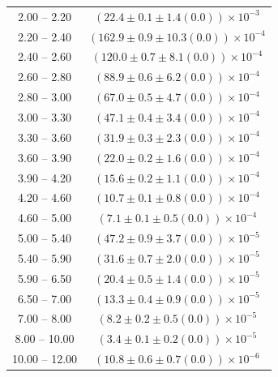 \begin{table}
\begin{center}
\begin{tabular}{ c | c }
2.00 -- 2.20 & $(22.4\pm0.1\pm1.4(0.0))\times10^{-3}$ \\ 
2.20 -- 2.40 & $(162.9\pm0.9\pm10.3(0.0))\times10^{-4}$ \\ 
2.40 -- 2.60 & $(120.0\pm0.7\pm8.1(0.0))\times10^{-4}$ \\ 
2.60 -- 2.80 & $(88.9\pm0.6\pm6.2(0.0))\times10^{-4}$ \\ 
2.80 -- 3.00 & $(67.0\pm0.5\pm4.7(0.0))\times10^{-4}$ \\ 
3.00 -- 3.30 & $(47.1\pm0.4\pm3.4(0.0))\times10^{-4}$ \\ 
3.30 -- 3.60 & $(31.9\pm0.3\pm2.3(0.0))\times10^{-4}$ \\ 
3.60 -- 3.90 & $(22.0\pm0.2\pm1.6(0.0))\times10^{-4}$ \\ 
3.90 -- 4.20 & $(15.6\pm0.2\pm1.1(0.0))\times10^{-4}$ \\ 
4.20 -- 4.60 & $(10.7\pm0.1\pm0.8(0.0))\times10^{-4}$ \\ 
4.60 -- 5.00 & $(7.1\pm0.1\pm0.5(0.0))\times10^{-4}$ \\ 
5.00 -- 5.40 & $(47.2\pm0.9\pm3.7(0.0))\times10^{-5}$ \\ 
5.40 -- 5.90 & $(31.6\pm0.7\pm2.0(0.0))\times10^{-5}$ \\ 
5.90 -- 6.50 & $(20.4\pm0.5\pm1.4(0.0))\times10^{-5}$ \\ 
6.50 -- 7.00 & $(13.3\pm0.4\pm0.9(0.0))\times10^{-5}$ \\ 
7.00 -- 8.00 & $(8.2\pm0.2\pm0.5(0.0))\times10^{-5}$ \\ 
8.00 -- 10.00 & $(3.4\pm0.1\pm0.2(0.0))\times10^{-5}$ \\ 
10.00 -- 12.00 & $(10.8\pm0.6\pm0.7(0.0))\times10^{-6}$ \\ 
\hline
\end{tabular}
\end{center}
\end{table}
 
